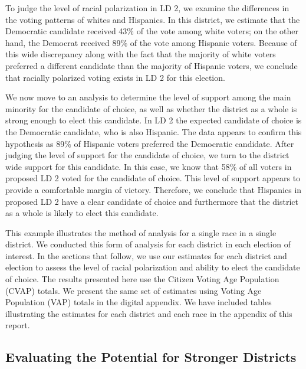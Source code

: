 \documentclass[12pt]{article}
\begin{document}
To judge the level of racial polarization in LD 2, we examine the differences in the voting patterns of whites and Hispanics. In this district, we estimate that the Democratic candidate received 43\% of the vote among white voters; on  the other hand, the Democrat received 89\% of the vote among Hispanic voters. Because of this wide discrepancy along with the fact that the majority of white voters preferred a different candidate than the majority of Hispanic voters, we conclude that racially polarized voting exists in LD 2 for this election. 

We now move to an analysis to determine the level of support among the main minority for the candidate of choice, as well as whether the district as a whole is strong enough to elect this candidate. In LD 2 the expected candidate of choice is the Democratic candidate, who is also Hispanic. The data appears to confirm this hypothesis as 89\% of Hispanic voters preferred the Democratic candidate. After judging the level of support for the candidate of choice, we turn to the district wide support for this candidate. In this case, we know that 58\% of all voters in proposed LD 2 voted for the candidate of choice. This level of support appears to provide a comfortable margin of victory. Therefore, we conclude that Hispanics in proposed LD 2 have a clear candidate of choice and furthermore that the district as a whole is likely to elect this candidate.

This example illustrates the method of analysis for a single race in a
single district. We conducted this form of analysis for each district
in each election of interest. In the sections that follow, we use our
estimates for each district and election to assess the level of racial
polarization and ability to elect the candidate of choice.  The
results presented here use the Citizen Voting Age Population (CVAP)
totals. We present the same set of estimates using Voting Age
Population (VAP) totals in the digital appendix.  We have included
tables illustrating the estimates for each district and each race in
the appendix of this report.

\subsection{Evaluating the Potential for Stronger Districts}
\end{document}

